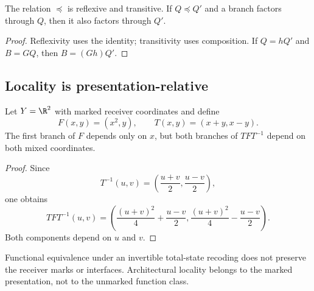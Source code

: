 \begin{proposition}\label{prop:refinement-preorder}
The relation $\preceq$ is reflexive and transitive. If $Q\preceq Q'$ and a branch factors through $Q$, then it also factors through $Q'$.
\end{proposition}

\begin{proof}
Reflexivity uses the identity; transitivity uses composition. If $Q=hQ'$ and $B=GQ$, then $B=(Gh)Q'$.
\end{proof}

\subsection{Locality is presentation-relative}

\begin{proposition}\label{prop:locality-conjugacy}
Let $Y=\R^2$ with marked receiver coordinates and define
\[
F(x,y)=(x^2,y),
\qquad
T(x,y)=(x+y,x-y).
\]
The first branch of $F$ depends only on $x$, but both branches of $TFT^{-1}$ depend on both mixed coordinates.
\end{proposition}

\begin{proof}
Since
\[
T^{-1}(u,v)=\left(\frac{u+v}{2},\frac{u-v}{2}\right),
\]
one obtains
\[
TFT^{-1}(u,v)
=
\left(
\frac{(u+v)^2}{4}+\frac{u-v}{2},
\frac{(u+v)^2}{4}-\frac{u-v}{2}
\right).
\]
Both components depend on $u$ and $v$.
\end{proof}

Functional equivalence under an invertible total-state recoding does not preserve the receiver marks or interfaces. Architectural locality belongs to the marked presentation, not to the unmarked function class.
